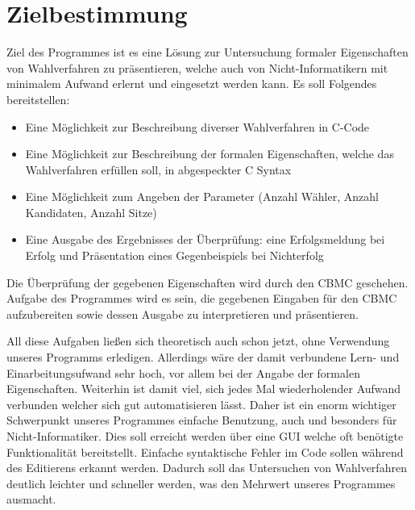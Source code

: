 \documentclass[a4paper]{scrreprt}
\begin{document}
\chapter{Zielbestimmung}
Ziel des Programmes ist es eine  Lösung zur Untersuchung formaler Eigenschaften von Wahlverfahren zu präsentieren, welche auch von Nicht-Informatikern mit minimalem Aufwand erlernt und eingesetzt werden kann. 
Es soll Folgendes bereitstellen:
\begin{itemize}
\item Eine Möglichkeit zur Beschreibung diverser Wahlverfahren in C-Code  
\item Eine Möglichkeit zur Beschreibung der formalen Eigenschaften, welche das Wahlverfahren erfüllen soll, in abgespeckter C Syntax 
\item Eine Möglichkeit zum Angeben der Parameter (Anzahl Wähler, Anzahl Kandidaten, Anzahl Sitze) 
\item Eine Ausgabe des Ergebnisses der Überprüfung: eine Erfolgsmeldung bei Erfolg und Präsentation eines Gegenbeispiels bei Nichterfolg
\end{itemize}

Die Überprüfung der gegebenen Eigenschaften wird durch den \ac{CBMC} geschehen. Aufgabe des Programmes wird es sein, die gegebenen Eingaben für den \ac{CBMC} aufzubereiten sowie dessen Ausgabe zu interpretieren und präsentieren. 

All diese Aufgaben ließen sich theoretisch auch schon jetzt, ohne Verwendung unseres Programms erledigen. Allerdings wäre der damit verbundene Lern- und Einarbeitungsufwand sehr hoch, vor allem bei der Angabe der formalen Eigenschaften. Weiterhin ist damit viel, sich jedes Mal wiederholender Aufwand verbunden welcher sich gut automatisieren lässt. Daher ist ein enorm wichtiger Schwerpunkt unseres Programmes einfache Benutzung, auch und besonders für Nicht-Informatiker. Dies soll erreicht werden über eine \ac{GUI} welche oft benötigte Funktionalität bereitstellt. Einfache syntaktische Fehler im Code sollen während des Editierens erkannt werden. Dadurch soll das Untersuchen von Wahlverfahren deutlich leichter und schneller werden, was den Mehrwert unseres Programmes ausmacht.
\end{document}
